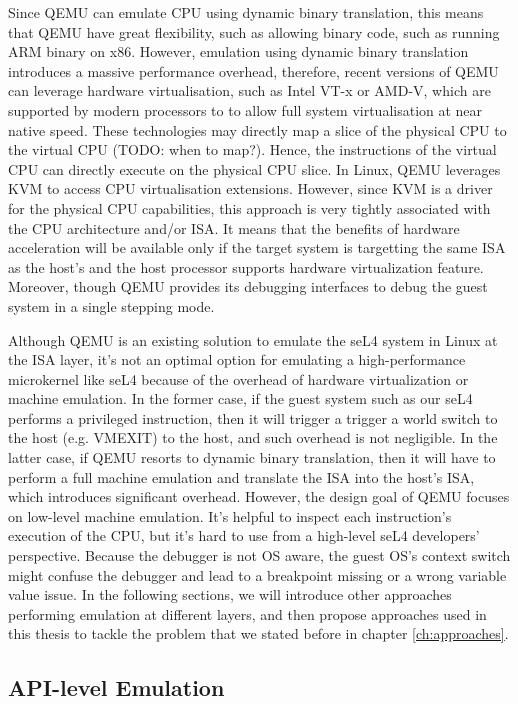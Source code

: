 Since QEMU can emulate CPU using dynamic binary translation, this means that QEMU have great flexibility, such as allowing binary code, such as running ARM binary on x86. However, emulation using dynamic binary translation introduces a massive performance overhead, therefore, recent versions of QEMU can leverage hardware virtualisation, such as Intel VT-x or AMD-V, which are supported by modern processors to to allow full system virtualisation at near native speed. These technologies may directly map a slice of the physical CPU to the virtual CPU (TODO: when to map?). Hence, the instructions of the virtual CPU can directly execute on the physical CPU slice. In Linux, QEMU leverages KVM to access CPU virtualisation extensions. However, since KVM is a driver for the physical CPU capabilities, this approach is very tightly associated with the CPU architecture and/or ISA. It means that the benefits of hardware acceleration will be available only if the target system is targetting the same ISA as the host's and the host processor supports hardware virtualization feature. Moreover, though QEMU provides its debugging interfaces to debug the guest system in a single stepping mode.

Although QEMU is an existing solution to emulate the seL4 system in Linux at the ISA layer, it's not an optimal option for emulating a high-performance microkernel like seL4 because of the overhead of hardware virtualization or machine emulation. In the former case, if the guest system such as our seL4 performs a privileged instruction, then it will trigger a trigger a world switch to the host (e.g. VMEXIT) to the host, and such overhead is not negligible. In the latter case, if QEMU resorts to dynamic binary translation, then it will have to perform a full machine emulation and translate the ISA into the host's ISA, which introduces significant overhead. However, the design goal of QEMU focuses on low-level machine emulation. It's helpful to inspect each instruction's execution of the CPU, but it's hard to use from a high-level seL4 developers' perspective. Because the debugger is not OS aware, the guest OS's context switch might confuse the debugger and lead to a breakpoint missing or a wrong variable value issue. In the following sections, we will introduce other approaches performing emulation at different layers, and then propose approaches used in this thesis to tackle the problem that we stated before in chapter \ref{ch:approaches}.

\subsection{API-level Emulation}

